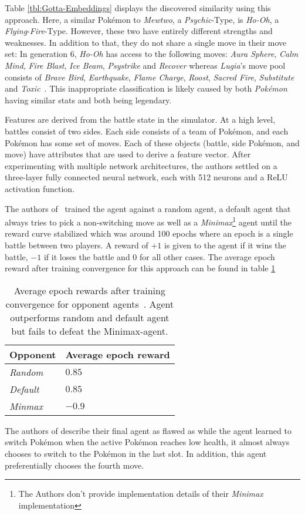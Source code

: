 Table \ref{tbl:Gotta-Embeddings} displays the discovered similarity using this approach. Here, a similar Pokémon
to \textit{Mewtwo}, a \textit{Psychic}-Type, is \textit{Ho-Oh}, a \textit{Flying}-\textit{Fire}-Type. However,
these two have entirely different strengths and weaknesses. In addition to that, they do not share a single
move in their move set: 
In generation 6, \textit{Ho-Oh} has access to the following moves: \textit{Aura Sphere}, \textit{Calm Mind}, 
\textit{Fire Blast}, \textit{Ice Beam}, \textit{Psystrike} and \textit{Recover} whereas \textit{Lugia}'s
move pool consists of \textit{Brave Bird}, \textit{Earthquake}, \textit{Flame Charge}, \textit{Roost},
\textit{Sacred Fire}, \textit{Substitute} and \textit{Toxic}~\autocite{DamageCalc:Gen6}. This inappropriate
classification is likely caused by both \textit{Pokémon} having similar stats and both being legendary.

Features are derived from the battle state in the simulator. At a high level, battles consist of two
sides. Each side consists of a team of Pokémon, and each Pokémon has some set of moves. Each of these 
objects (battle, side Pokémon, and move) have attributes that are used to derive a feature vector.
After experimenting with multiple network architectures, the authors settled on a three-layer 
fully connected neural network, each with 512 neurons and a ReLU activation function.

The authors of~\cite{GottaTrainEmAll} trained the agent against a random agent, a default agent 
that always tries to pick a non-switching move as well as a \emph{Minimax}\footnote{The Authors don't
provide implementation details of their \emph{Minimax} implementation} agent
until the reward curve stabilized which was around 100 epochs where an epoch is a single battle between
two players. A reward of $+1$ is given to the agent if it wins the battle, $-1$ if it loses the battle and
$0$ for all other cases. The average epoch reward after training convergence for this approach can
be found in table \ref{tbl:Gotta-Performance}
\begin{table}[h]
    \centering
        \begin{tabular}{|l|l|}
            \hline
            Opponent & Average epoch reward \\
            \hline
            \emph{Random} & $0.85$ \\
            \hline
            \emph{Default} & $0.85$ \\
            \hline
            \emph{Minmax} & $-0.9$ \\
            \hline
        \end{tabular}
        \caption{Average epoch rewards after training convergence for opponent agents~\autocite{GottaTrainEmAll}. Agent
        outperforms random and default agent but fails to defeat the Minimax-agent.}
        \label{tbl:Gotta-Performance}
\end{table}
The authors of \cite{GottaTrainEmAll} describe their final agent as flawed as while the agent learned 
to switch Pokémon when the active Pokémon reaches low health, it almost always chooses to switch to the
Pokémon in the last slot. In addition, this agent preferentially chooses the fourth move. 

